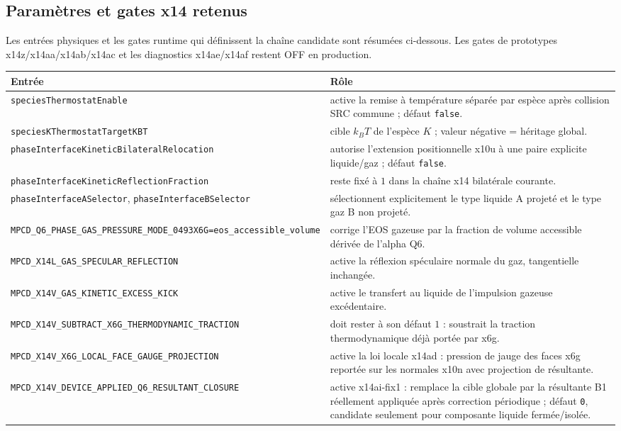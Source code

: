 \documentclass[11pt,a4paper]{article}
\begin{document}
\subsection{Paramètres et gates x14 retenus}

Les entrées physiques et les gates runtime qui définissent la chaîne candidate sont résumées ci-dessous. Les gates de prototypes x14z/x14aa/x14ab/x14ac et les diagnostics x14ae/x14af restent OFF en production.
\begin{center}
\footnotesize
\begin{tabular}{p{}p{}}
\toprule
Entrée & Rôle\\
\midrule
\nolinkurl{speciesThermostatEnable} &
active la remise à température séparée par espèce après collision SRC commune ; défaut \texttt{false}.\\
\nolinkurl{speciesKThermostatTargetKBT} &
cible $k_BT$ de l'espèce $K$ ; valeur négative = héritage global.\\
\nolinkurl{phaseInterfaceKineticBilateralRelocation} &
autorise l'extension positionnelle x10u à une paire explicite liquide/gaz ; défaut \texttt{false}.\\
\nolinkurl{phaseInterfaceKineticReflectionFraction} &
reste fixé à $1$ dans la chaîne x14 bilatérale courante.\\
\nolinkurl{phaseInterfaceASelector}, \nolinkurl{phaseInterfaceBSelector} &
sélectionnent explicitement le type liquide A projeté et le type gaz B non projeté.\\
\nolinkurl{MPCD_Q6_PHASE_GAS_PRESSURE_MODE_0493X6G=eos_accessible_volume} &
corrige l'EOS gazeuse par la fraction de volume accessible dérivée de l'alpha Q6.\\
\nolinkurl{MPCD_X14L_GAS_SPECULAR_REFLECTION} &
active la réflexion spéculaire normale du gaz, tangentielle inchangée.\\
\nolinkurl{MPCD_X14V_GAS_KINETIC_EXCESS_KICK} &
active le transfert au liquide de l'impulsion gazeuse excédentaire.\\
\nolinkurl{MPCD_X14V_SUBTRACT_X6G_THERMODYNAMIC_TRACTION} &
doit rester à son défaut $1$ : soustrait la traction thermodynamique déjà portée par x6g.\\
\nolinkurl{MPCD_X14V_X6G_LOCAL_FACE_GAUGE_PROJECTION} &
active la loi locale x14ad : pression de jauge des faces x6g reportée sur les normales x10n avec projection de résultante.\\
\nolinkurl{MPCD_X14V_DEVICE_APPLIED_Q6_RESULTANT_CLOSURE} &
active x14ai-fix1 : remplace la cible globale par la résultante B1 réellement appliquée après correction périodique ; défaut \texttt{0}, candidate seulement pour composante liquide fermée/isolée.\\
\bottomrule
\end{tabular}
\end{center}
\end{document}
